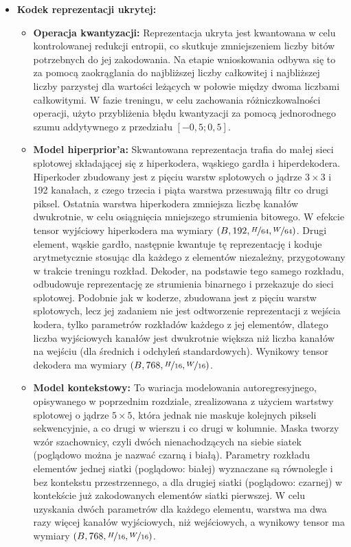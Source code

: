 \begin{itemize}
	\item \textbf{Kodek reprezentacji ukrytej:}
	\begin{itemize}
		\item \textbf{Operacja kwantyzacji:} Reprezentacja ukryta jest kwantowana w celu kontrolowanej redukcji entropii, co skutkuje zmniejszeniem liczby bitów potrzebnych do jej zakodowania. Na etapie wnioskowania odbywa się to za pomocą zaokrąglania do najbliższej liczby całkowitej i najbliższej liczby parzystej dla wartości leżących w połowie między dwoma liczbami całkowitymi. W fazie treningu, w celu zachowania różniczkowalności operacji, użyto przybliżenia błędu kwantyzacji za pomocą jednorodnego szumu addytywnego z przedziału \( \left[-0,5; 0,5\right] \).
		\item \textbf{Model hiperprior'a:} Skwantowana reprezentacja trafia do małej sieci splotowej składającej się z hiperkodera, wąskiego gardła i hiperdekodera. Hiperkoder zbudowany jest z pięciu warstw splotowych o jądrze \( 3 \times 3 \) i 192 kanałach, z czego trzecia i piąta warstwa przesuwają filtr co drugi piksel. Ostatnia warstwa hiperkodera zmniejsza liczbę kanałów dwukrotnie, w celu osiągnięcia mniejszego strumienia bitowego. W efekcie tensor wyjściowy hiperkodera ma wymiary \( \left(B, 192, \nicefrac{H}{64}, \nicefrac{W}{64} \right) \). Drugi element, wąskie gardło, następnie kwantuje tę reprezentację i koduje arytmetycznie stosując dla każdego z elementów niezależny, przygotowany w trakcie treningu rozkład. Dekoder, na podstawie tego samego rozkładu, odbudowuje reprezentację ze strumienia binarnego i przekazuje do sieci splotowej. Podobnie jak w koderze, zbudowana jest z pięciu warstw splotowych, lecz jej zadaniem nie jest odtworzenie reprezentacji z wejścia kodera, tylko parametrów rozkładów każdego z jej elementów, dlatego liczba wyjściowych kanałów jest dwukrotnie większa niż liczba kanałów na wejściu (dla średnich i odchyleń standardowych). Wynikowy tensor dekodera ma wymiary \( \left(B, 768, \nicefrac{H}{16}, \nicefrac{W}{16} \right) \).
		\item \textbf{Model kontekstowy:} To wariacja modelowania autoregresyjnego, opisywanego w poprzednim rozdziale, zrealizowana z użyciem wartstwy splotowej o jądrze \( 5 \times 5 \), która jednak nie maskuje kolejnych pikseli sekwencyjnie, a co drugi w wierszu i co drugi w kolumnie. Maska tworzy wzór szachownicy, czyli dwóch nienachodzących na siebie siatek (poglądowo można je nazwać czarną i białą). Parametry rozkładu elementów jednej siatki (poglądowo: białej) wyznaczane są równolegle i bez kontekstu przestrzennego, a dla drugiej siatki (poglądowo: czarnej) w kontekście już zakodowanych elementów siatki pierwszej. W celu uzyskania dwóch parametrów dla każdego elementu, warstwa ma dwa razy więcej kanałów wyjściowych, niż wejściowych, a wynikowy tensor ma wymiary \( \left(B, 768, \nicefrac{H}{16}, \nicefrac{W}{16} \right) \).

\end{itemize}
\end{itemize}
